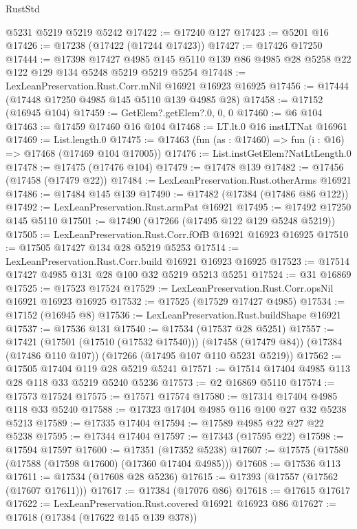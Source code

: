 \begin{lexlean}{RustStd}
\begin{coremodule}
    @5231
    @5219
    @5219
    @5242
@17422 := @17240 @127
@17423 := @5201 @16
@17426 := @17238 (@17422 (@17244 @17423))
@17427 := @17426 @17250
@17444 := @17398
    @17427
    @4985
    @145
    @5110
    @139
    @86
    @4985
    @28
    @5258
    @22
    @122
    @129
    @134
    @5248
    @5219
    @5219
    @5254
@17448 := LexLeanPreservation.Rust.Corr.mNil @16921 @16923 @16925
@17456 := @17444 (@17448 @17250 @4985 @145 @5110 @139 @4985 @28)
@17458 := @17152 (@16945 @104)
@17459 := GetElem?.getElem?.{0, 0, 0}
@17460 := @6 @104
@17463 := @17459 @17460 @16 @104
@17468 := LT.lt.{0} @16 instLTNat @16961
@17469 := List.length.{0}
@17475 := @17463 (fun (as : @17460) => fun (i : @16) => @17468 (@17469 @104 @17005))
@17476 := List.instGetElem?NatLtLength.{0}
@17478 := @17475 (@17476 @104)
@17479 := @17478 @139
@17482 := @17456 (@17458 (@17479 @22))
@17484 := LexLeanPreservation.Rust.otherArms @16921
@17486 := @17484 @145 @139
@17490 := @17482 (@17384 (@17486 @86 @122))
@17492 := LexLeanPreservation.Rust.armPat @16921
@17495 := @17492 @17250 @145 @5110
@17501 := @17490 (@17266 (@17495 @122 @129 @5248 @5219))
@17505 := LexLeanPreservation.Rust.Corr.fOfB @16921 @16923 @16925
@17510 := @17505 @17427 @134 @28 @5219 @5253
@17514 := LexLeanPreservation.Rust.Corr.build @16921 @16923 @16925
@17523 := @17514 @17427 @4985 @131 @28 @100 @32 @5219 @5213 @5251
@17524 := @31 @16869
@17525 := @17523 @17524
@17529 := LexLeanPreservation.Rust.Corr.opsNil @16921 @16923 @16925
@17532 := @17525 (@17529 @17427 @4985)
@17534 := @17152 (@16945 @8)
@17536 := LexLeanPreservation.Rust.buildShape @16921
@17537 := @17536 @131
@17540 := @17534 (@17537 @28 @5251)
@17557 := @17421
    (@17501 (@17510 (@17532 @17540)))
    (@17458 (@17479 @84))
    (@17384 (@17486 @110 @107))
    (@17266 (@17495 @107 @110 @5231 @5219))
@17562 := @17505 @17404 @119 @28 @5219 @5241
@17571 := @17514 @17404 @4985 @113 @28 @118 @33 @5219 @5240 @5236
@17573 := @2 @16869 @5110
@17574 := @17573 @17524
@17575 := @17571 @17574
@17580 := @17314 @17404 @4985 @118 @33 @5240
@17588 := @17323 @17404 @4985 @116 @100 @27 @32 @5238 @5213
@17589 := @17335 @17404
@17594 := @17589 @4985 @22 @27 @22 @5238
@17595 := @17344 @17404
@17597 := @17343 (@17595 @22)
@17598 := @17594 @17597
@17600 := @17351 (@17352 @5238)
@17607 := @17575 (@17580 (@17588 (@17598 @17600) (@17360 @17404 @4985)))
@17608 := @17536 @113
@17611 := @17534 (@17608 @28 @5236)
@17615 := @17393 (@17557 (@17562 (@17607 @17611)))
@17617 := @17384 (@17076 @86)
@17618 := @17615 @17617
@17622 := LexLeanPreservation.Rust.covered @16921 @16923 @86
@17627 := @17618 (@17384 (@17622 @145 @139 @378))

\end{coremodule}
\end{lexlean}
